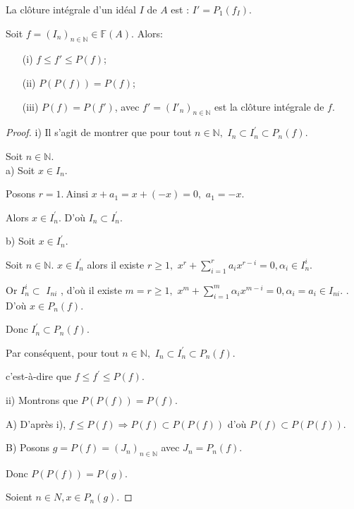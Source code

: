\begin{maremarque}
	La clôture intégrale d'un idéal $I$ de $A$ est : $I'=P_1(f_I)$.
\end{maremarque}
\begin{maproposition}
	Soit $f=(I_n)_{n \in \mathbb{N}} \in \mathbb{F}(A)$. Alors:\\
	\begin{enumerate}
		\item[(i)] $ f \leqslant f' \leqslant P(f)$;
		\item[(ii)] $ P(P(f)) = P(f)$;
		\item[(iii)] $P(f) = P(f')$, avec $f'=(I'_n)_{n \in \mathbb{N}}$ est la clôture intégrale de $f$.
	\end{enumerate}
\end{maproposition}
\begin{proof}
	i) Il s'agit de montrer que pour tout $n\in \mathbb{N},$ $I_{n}\subset I_{n}^{\prime }\subset P_{n}(f)$.
	
	Soit $n\in \mathbb{N}.$ \\
	a) Soit $x\in I_{n}.$
	
	Posons $r=1.~$Ainsi $x+a_{1}=x+(-x)=0,$ $a_{1}=-x$.
	
	Alors $x\in I_{n}^{\prime }.$ D'où $I_{n}\subset I_{n}^{\prime }.$
	
	b) Soit $x\in I_{n}^{\prime }.$
	
	Soit $n\in \mathbb{N}.$
	$x\in I_{n}^{\prime }$ alors il existe $r\geq 1,$ $x^{r}+\sum\limits_{i=1}^{r}a_{i}x^{r-i}=0,\alpha _{i}\in I_{n}^{i}$.
	
	Or $I_{n}^{i}\subset $ $I_{ni}$ , d'où il existe $m=r\geq 1,$ $x^{m}+\sum\limits_{i=1}^{m}\alpha _{i}x^{m-i}=0,\alpha _{i}=a_{i}\in I_{ni}$.
	.
	D'où $x\in P_{n}(f)$.
	
	Donc $I_{n}^{\prime }\subset P_{n}(f)$.
	
	Par conséquent, pour tout $n\in \mathbb{N},$ $I_{n}\subset I_{n}^{\prime }\subset P_{n}(f).$
	
	c'est-\`{a}-dire que $f\leq f^{\prime }\leq P(f)$.
	
	ii) Montrons que $P(P(f))=P(f).$
	
	A) D'après i), $f\leq P(f)\Rightarrow P(f)\subset P(P(f))$ d'où $P(f)\subset P(P(f))$.
	
	B) Posons $g=P(f)=(J_{n})_{n\in \mathbb{N}}$ avec $J_{n}=P_{n}(f)$.
	
	Donc $P(P(f))=P(g)$.
	
	Soient $n\in N,x\in P_{n}(g).$
	

\end{proof}
